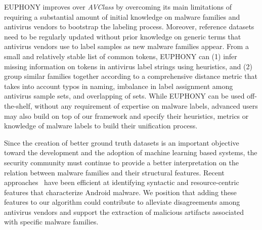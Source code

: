 EUPHONY improves over {\em AVClass} by overcoming its main limitations of requiring a substantial amount of initial knowledge on malware families and antivirus vendors to bootstrap the labeling process.
Moreover, reference datasets need to be regularly updated without prior knowledge on generic terms that antivirus vendors use to label samples as new malware families appear.
From a small and relatively stable list of common tokens, EUPHONY can (1) infer missing information on tokens in antivirus label strings using heuristics, and (2) group similar families together according to a comprehensive distance metric that takes into account typos in naming, imbalance in label assignment among antivirus sample sets, and overlapping of sets.
While EUPHONY can be used off-the-shelf, without any requirement of expertise on malware labels, advanced users may also build on top of our framework and specify their heuristics, metrics or knowledge of malware labels to build their unification process.

Since the creation of better ground truth datasets is an important objective toward the development and the adoption of machine learning based systems, the security community must continue to provide a better interpretation on the relation between malware families and their structural features.
Recent approaches~\cite{suarez-tangil_droidsieve:_2017} have been efficient at identifying syntactic and resource-centric features that characterize Android malware.
We position that adding these features to our algorithm could contribute to alleviate disagreements among antivirus vendors and support the extraction of malicious artifacts associated with specific malware families.
